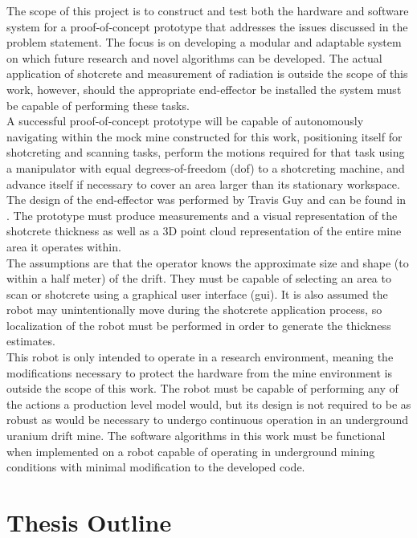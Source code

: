 The scope of this project is to construct and test both the hardware and software system for a proof-of-concept prototype that addresses the issues discussed in the problem statement. The focus is on developing a modular and adaptable system on which future research and novel algorithms can be developed. The actual application of shotcrete and measurement of radiation is outside the scope of this work, however, should the appropriate end-effector be installed the system must be capable of performing these tasks.\\

A successful proof-of-concept prototype will be capable of autonomously navigating within the mock mine constructed for this work, positioning itself for shotcreting and scanning tasks, perform the motions required for that task using a manipulator with equal degrees-of-freedom (\acrshort{dof}) to a shotcreting machine, and advance itself if necessary to cover an area larger than its stationary workspace. The design of the end-effector was performed by Travis Guy and can be found in \cite{travis}. The prototype must produce measurements and a visual representation of the shotcrete thickness as well as a 3D point cloud representation of the entire mine area it operates within.\\

The assumptions are that the operator knows the approximate size and shape (to within a half meter) of the drift. They must be capable of selecting an area to scan or shotcrete using a graphical user interface (\acrshort{gui}). It is also assumed the robot may unintentionally move during the shotcrete application process, so localization of the robot must be performed in order to generate the thickness estimates.\\

This robot is only intended to operate in a research environment, meaning the modifications necessary to protect the hardware from the mine environment is outside the scope of this work. The robot must be capable of performing any of the actions a production level model would, but its design is not required to be as robust as would be necessary to undergo continuous operation in an underground uranium drift mine. The software algorithms in this work must be functional when implemented on a robot capable of operating in underground mining conditions with minimal modification to the developed code.\\

\section{Thesis Outline}
\label{sec:outline}

